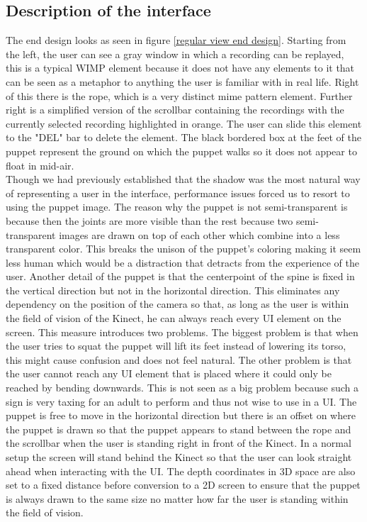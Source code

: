 \subsection{Description of the interface}
\label{interface description}

The end design looks as seen in figure \ref{regular view end design}. Starting from the left, the user can see a gray window in which a recording can be replayed, this is a typical WIMP element because it does not have any elements to it that can be seen as a metaphor to anything the user is familiar with in real life. Right of this there is the rope, which is a very distinct mime pattern element. Further right is a simplified version of the scrollbar containing the recordings with the currently selected recording highlighted in orange. The user can slide this element to the "DEL" bar to delete the element. The black bordered box at the feet of the puppet represent the ground on which the puppet walks so it does not appear to float in mid-air.\\

Though we had previously established that the shadow was the most natural way of representing a user in the interface, performance issues forced us to resort to using the puppet image. The reason why the puppet is not semi-transparent is because then the joints are more visible than the rest because two semi-transparent images are drawn on top of each other which combine into a less transparent color. This breaks the unison of the puppet's coloring making it seem less human which would be a distraction that detracts from the experience of the user. Another detail of the puppet is that the centerpoint of the spine is fixed in the vertical direction but not in the horizontal direction. This eliminates any dependency on the position of the camera so that, as long as the user is within the field of vision of the Kinect, he can always reach every UI element on the screen. This measure introduces two  problems. The biggest problem is that when the user tries to squat the puppet will lift its feet instead of lowering its torso, this might cause confusion and does not feel natural. The other problem is that the user cannot reach any UI element that is placed where it could only be reached by bending downwards. This is not seen as a big problem because such a sign is very taxing for an adult to perform and thus not wise to use in a UI. The puppet is free to move in the horizontal direction but there is an offset on where the puppet is drawn so that the puppet appears to stand between the rope and the scrollbar when the user is standing right in front of the Kinect. In a normal setup the screen will stand behind the Kinect so that the user can look straight ahead when interacting with the UI. The depth coordinates in 3D space are also set to a fixed distance before conversion to a 2D screen to ensure that the puppet is always drawn to the same size no matter how far the user is standing within the field of vision.\\

